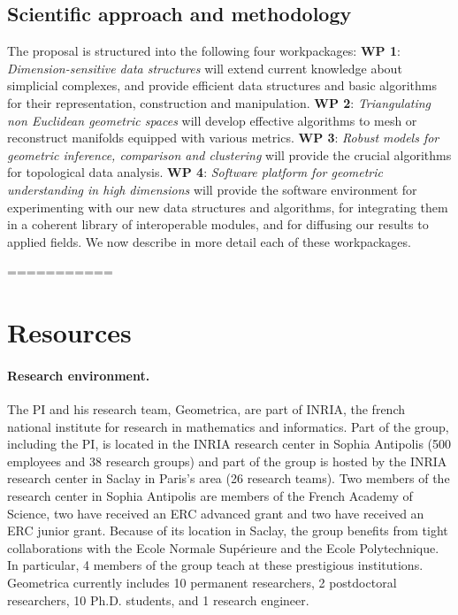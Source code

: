 \subsection{Scientific approach and methodology}

The proposal is structured into the following four workpackages:
{\bf WP 1}:  {\em Dimension-sensitive data  structures} will extend current knowledge about simplicial complexes, and  provide efficient data structures and basic algorithms for their representation, construction and manipulation. 
  {\bf WP 2}:  {\em Triangulating non Euclidean geometric spaces} will develop effective algorithms to mesh or reconstruct manifolds equipped with various metrics.   {\bf WP 3}: {\em Robust models for geometric inference, comparison and  clustering} will provide the crucial  algorithms for topological data analysis.
 {\bf WP 4}:  {\em  Software platform for geometric understanding in high dimensions} will provide the software environment for experimenting with our new data structures and algorithms, for integrating them in a coherent library of interoperable modules, and for diffusing our results to applied fields. We now describe in more detail each of these workpackages.




===========










\section{Resources}

\paragraph{Research environment.}
The PI and his research team, Geometrica, are part of INRIA, the french national institute for research in mathematics and informatics. Part of the group, including the PI, is located in the INRIA research center in Sophia Antipolis  (500 employees and 38 research groups) and part of the group is hosted by the INRIA research center in Saclay in Paris's area (26 research teams). Two members of the research center in Sophia Antipolis are members of the French Academy of Science, two have received an ERC advanced grant and two have received an ERC junior grant. Because of its location in Saclay, the group benefits from tight collaborations with the Ecole Normale Sup\'erieure and the Ecole Polytechnique. In particular, 4 members of the group teach at these prestigious institutions. Geometrica currently includes 10 permanent researchers,  2 postdoctoral researchers, 10 Ph.D. students, and 1 research engineer. 

